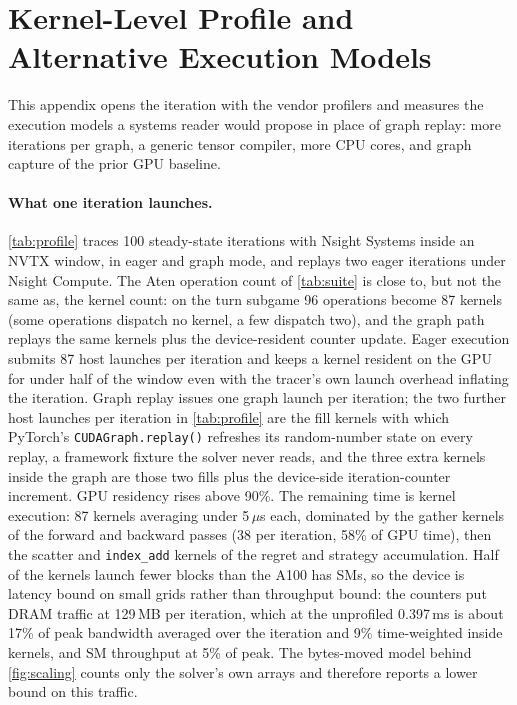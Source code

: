 \section{Kernel-Level Profile and Alternative Execution Models}
\label{app:profile}

This appendix opens the iteration with the vendor profilers and measures the
execution models a systems reader would propose in place of graph replay: more
iterations per graph, a generic tensor compiler, more CPU cores, and graph capture
of the prior GPU baseline.

\paragraph{What one iteration launches.}
\cref{tab:profile} traces 100 steady-state iterations with Nsight Systems inside an
NVTX window, in eager and graph mode, and replays two eager iterations under Nsight
Compute. The Aten operation count of \cref{tab:suite} is close to, but not the same
as, the kernel count: on the turn subgame 96 operations become 87 kernels (some
operations dispatch no kernel, a few dispatch two), and the graph path replays the
same kernels plus the device-resident counter update. Eager execution submits 87
host launches per iteration and keeps a kernel resident on the GPU for under half of
the window even with the tracer's own launch overhead inflating the iteration. Graph
replay issues one graph launch per iteration; the two further host launches per
iteration in \cref{tab:profile} are the fill kernels with which PyTorch's
\texttt{CUDAGraph.replay()} refreshes its random-number state on every replay, a
framework fixture the solver never reads, and the three extra kernels inside the
graph are those two fills plus the device-side iteration-counter increment. GPU
residency rises above 90\%. The remaining time is kernel execution: 87 kernels averaging under
5\,$\mu$s each, dominated by the gather kernels of the forward and backward passes
(38 per iteration, 58\% of GPU time), then the scatter and \texttt{index\_add}
kernels of the regret and strategy accumulation. Half of the kernels launch fewer
blocks than the A100 has SMs, so the device is latency bound on small grids rather
than throughput bound: the counters put DRAM traffic at 129\,MB per iteration, which
at the unprofiled 0.397\,ms is about 17\% of peak bandwidth averaged over the
iteration and 9\% time-weighted inside kernels, and SM throughput at 5\% of peak.
The bytes-moved model behind \cref{fig:scaling} counts only the solver's own
arrays and therefore reports a lower bound on this traffic.

